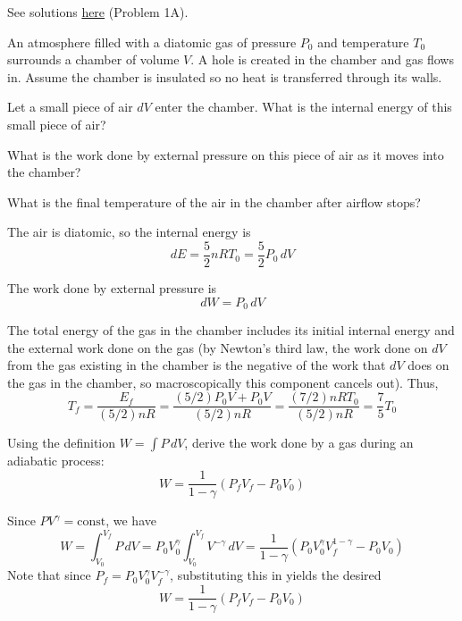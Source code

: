 \documentclass[11pt]{scrartcl}
\begin{document}
\begin{sol}
    See solutions \href{https://apho.olimpicos.net/pdf/APhO_2005_S1.pdf}{here} (Problem 1A). 
\end{sol}

\begin{prob}
    An atmosphere filled with a diatomic gas of pressure $P_0$ and temperature $T_0$ surrounds a chamber of volume $V$. A hole is created in the chamber and gas flows in. Assume the chamber is insulated so no heat is transferred through its walls. 
    \begin{anum}
        \item Let a small piece of air $dV$ enter the chamber. What is the internal energy of this small piece of air?
        \item What is the work done by external pressure on this piece of air as it moves into the chamber?
        \item What is the final temperature of the air in the chamber after airflow stops?
    \end{anum}
\end{prob}

\begin{sol}
    \begin{anum}
        \item The air is diatomic, so the internal energy is $$dE=\frac52nRT_0=\boxed{\frac52P_0\, dV}$$
        \item The work done by external pressure is $$dW=\boxed{P_0\, dV}$$
        \item The total energy of the gas in the chamber includes its initial internal energy and the external work done on the gas (by Newton's third law, the work done on $dV$ from the gas existing in the chamber is the negative of the work that $dV$ does on the gas in the chamber, so macroscopically this component cancels out). Thus, $$T_f=\frac{E_f}{(5/2)nR}=\frac{(5/2)P_0V+P_0V}{(5/2)nR}=\frac{(7/2)nRT_0}{(5/2)nR}=\boxed{\frac75T_0}$$
    \end{anum}
\end{sol}

\begin{prob}
    Using the definition $W=\int P\, dV$, derive the work done by a gas during an adiabatic process: $$W=\frac{1}{1-\gamma}(P_fV_f-P_0V_0)$$
\end{prob}

\begin{sol}
    Since $PV^\gamma=\text{const}$, we have $$W=\int_{V_0}^{V_f} P\, dV=P_0V_0^\gamma\int_{V_0}^{V_f} V^{-\gamma}\, dV=\frac{1}{1-\gamma}(P_0V_0^\gamma V_f^{1-\gamma}-P_0V_0)$$Note that since $P_f=P_0V_0^\gamma V_f^{-\gamma}$, substituting this in yields the desired $$W=\boxed{\frac{1}{1-\gamma}(P_fV_f-P_0V_0)}$$
\end{sol}
\end{document}
